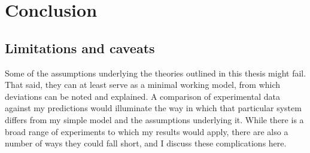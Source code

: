 \chapter{Conclusion}



\section{Limitations and caveats}
Some of the assumptions underlying the theories outlined in this thesis might fail. %
That said, they can at least serve as a minimal working model, from which deviations can be noted and explained. 
A comparison of experimental data against my predictions would illuminate the way in which that particular system differs from my simple model and the assumptions underlying it. 
While there is a broad range of experiments to which my results would apply, there are also a number of ways they could fall short, and I discuss these complications here. 

